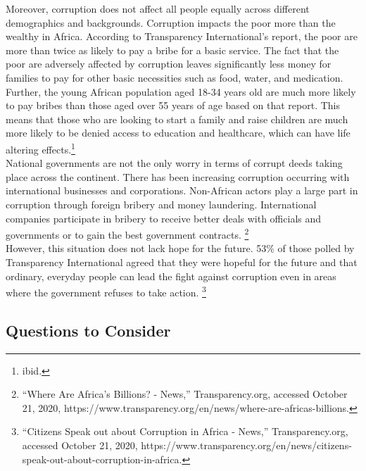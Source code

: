\documentclass[10pt, letterpaper]{article}
\begin{document}
Moreover, corruption does not affect all people equally across different
demographics and backgrounds. Corruption impacts the poor more than the
wealthy in Africa. According to Transparency International's report, the
poor are more than twice as likely to pay a bribe for a basic service.
The fact that the poor are adversely affected by corruption leaves
significantly less money for families to pay for other basic necessities
such as food, water, and medication. Further, the young African
population aged 18-34 years old are much more likely to pay bribes than
those aged over 55 years of age based on that report. This means that
those who are looking to start a family and raise children are much more
likely to be denied access to education and healthcare, which can have
life altering effects.\footnote{ibid.} \\

National governments are not the only worry in terms of corrupt deeds
taking place across the continent. There has been increasing corruption
occurring with international businesses and corporations. Non-African
actors play a large part in corruption through foreign bribery and money
laundering. International companies participate in bribery to receive
better deals with officials and governments or to gain the best
government contracts. \footnote{``Where Are Africa's Billions? - News,''
  Transparency.org, accessed October 21, 2020,
  https://www.transparency.org/en/news/where-are-africas-billions.} \\

However, this situation does not lack hope for the future. 53\% of those
polled by Transparency International agreed that they were hopeful for
the future and that ordinary, everyday people can lead the fight against
corruption even in areas where the government refuses to take action.
\footnote{``Citizens Speak out about Corruption in Africa - News,''
  Transparency.org, accessed October 21, 2020,
  https://www.transparency.org/en/news/citizens-speak-out-about-corruption-in-africa.} \\

\subsection{Questions to Consider}
\end{document}
